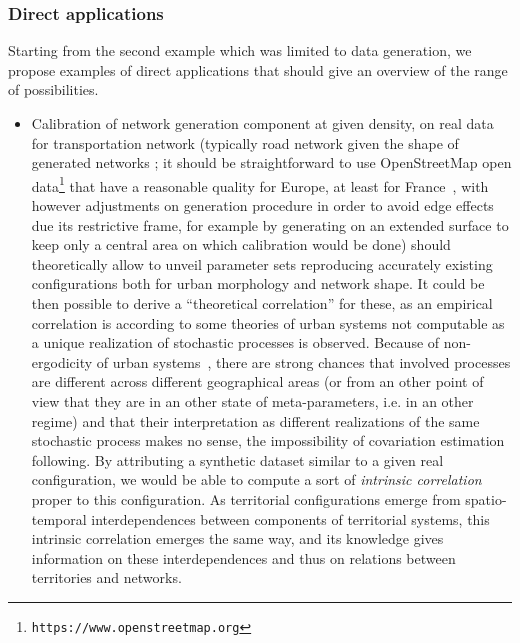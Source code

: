 \subsubsection*{Direct applications}


Starting from the second example which was limited to data generation, we propose examples of direct applications that should give an overview of the range of possibilities.


\begin{itemize}
\item Calibration of network generation component at given density, on real data for transportation network (typically road network given the shape of generated networks ; it should be straightforward to use OpenStreetMap open data\footnote{\texttt{https://www.openstreetmap.org}} that have a reasonable quality for Europe, at least for France~\cite{girres2010quality}, with however adjustments on generation procedure in order to avoid edge effects due its restrictive frame, for example by generating on an extended surface to keep only a central area on which calibration would be done) should theoretically allow to unveil parameter sets reproducing accurately existing configurations both for urban morphology and network shape. It could be then possible to derive a ``theoretical correlation'' for these, as an empirical correlation is according to some theories of urban systems not computable as a unique realization of stochastic processes is observed. Because of non-ergodicity of urban systems~\cite{pumain2012urban}, there are strong chances that involved processes are different across different geographical areas (or from an other point of view that they are in an other state of meta-parameters, i.e. in an other regime) and that their interpretation as different realizations of the same stochastic process makes no sense, the impossibility of covariation estimation following. By attributing a synthetic dataset similar to a given real configuration, we would be able to compute a sort of \emph{intrinsic correlation} proper to this configuration. As territorial configurations emerge from spatio-temporal interdependences between components of territorial systems, this intrinsic correlation emerges the same way, and its knowledge gives information on these interdependences and thus on relations between territories and networks.

\end{itemize}
